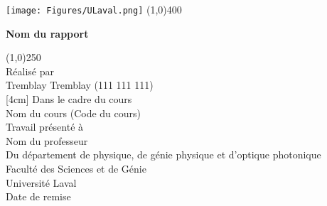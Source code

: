 \begin{titlepage}
\begin{center}
\texttt{[image: Figures/ULaval.png]}
\line(1,0){400}\\
[2mm]
\begin{large}
\textbf{Nom du rapport}\\ 
\end{large}
\line(1,0){250}\\
[1.5cm]
Réalisé par\\
Tremblay Tremblay (111 111 111)\\
[4cm]
Dans le cadre du cours\\
Nom du cours (Code du cours)\\ 
[2.5cm]
Travail présenté à\\
Nom du professeur\\
[4cm]
Du département de physique, de génie physique et d'optique photonique\\
Faculté des Sciences et de Génie\\
Université Laval\\
Date de remise
\end{center} 
\end{titlepage}